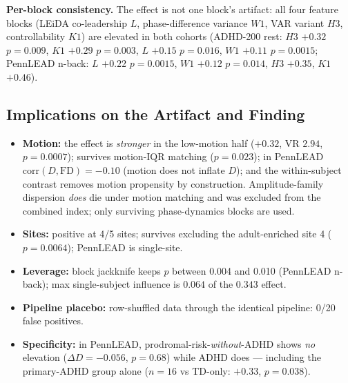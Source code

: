 \documentclass{article}
\begin{document}
\textbf{Per-block consistency.} The effect is not one block's artifact: all four feature blocks (LEiDA co-leadership $L$, phase-difference variance $W1$, VAR variant $H3$, controllability $K1$) are elevated in both cohorts (ADHD-200 rest: $H3$ $+0.32$ $p{=}0.009$, $K1$ $+0.29$ $p{=}0.003$, $L$ $+0.15$ $p{=}0.016$, $W1$ $+0.11$ $p{=}0.0015$; PennLEAD n-back: $L$ $+0.22$ $p{=}0.0015$, $W1$ $+0.12$ $p{=}0.014$, $H3$ $+0.35$, $K1$ $+0.46$).


\subsection{Implications on the Artifact and Finding}


\begin{itemize}
\item \textbf{Motion:} the effect is \emph{stronger} in the low-motion half ($+0.32$, VR $2.94$, $p{=}0.0007$); survives motion-IQR matching ($p{=}0.023$); in PennLEAD $\mathrm{corr}(D,\mathrm{FD}){=}-0.10$ (motion does not inflate $D$); and the within-subject contrast removes motion propensity by construction. Amplitude-family dispersion \emph{does} die under motion matching and was excluded from the combined index; only surviving phase-dynamics blocks are used.
\item \textbf{Sites:} positive at 4/5 sites; survives excluding the adult-enriched site 4 ($p{=}0.0064$); PennLEAD is single-site.
\item \textbf{Leverage:} block jackknife keeps $p$ between 0.004 and 0.010 (PennLEAD n-back); max single-subject influence is $0.064$ of the $0.343$ effect.
\item \textbf{Pipeline placebo:} row-shuffled data through the identical pipeline: 0/20 false positives.
\item \textbf{Specificity:} in PennLEAD, prodromal-risk-\emph{without}-ADHD shows \emph{no} elevation ($\Delta D{=}-0.056$, $p{=}0.68$) while ADHD does --- including the primary-ADHD group alone ($n{=}16$ vs TD-only: $+0.33$, $p{=}0.038$).
\end{itemize}
\end{document}
